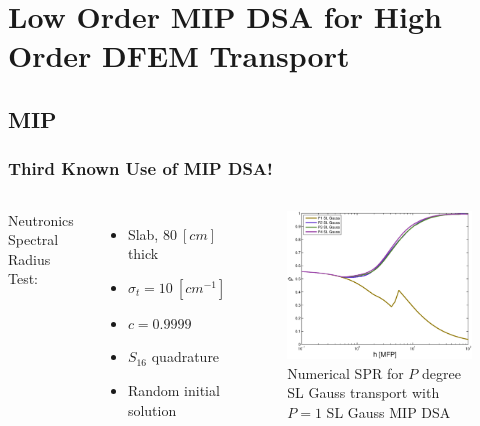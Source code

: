 \documentclass{beamer}
\begin{document}
\section[MIP DSA]{Low Order MIP DSA for High Order DFEM Transport}
\subsection{MIP}
\begin{frame}
\frametitle{Third Known Use of MIP DSA!}
\begin{columns}[c]
Neutronics Spectral Radius Test:
\begin{itemize}
\item Slab, $80~[cm]$ thick 
\item $\sigma_t = 10~[cm^{-1}]$
\item $c=0.9999$
\item $S_{16}$ quadrature
\item Random initial solution
\end{itemize}

\begin{figure}
\includegraphics[width =7cm]{SL_Gauss_MIP_SPR.eps}
\caption{Numerical SPR for $P$ degree SL Gauss transport with $P=1$ SL Gauss MIP DSA}
\end{figure}
\end{columns}
\end{frame}
\end{document}
